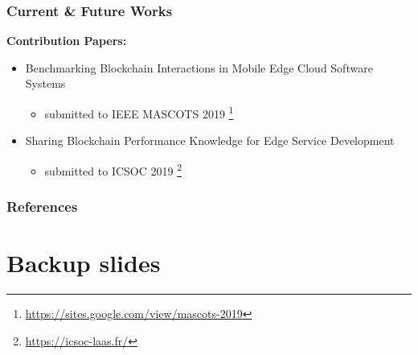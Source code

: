 \documentclass{beamer}
\begin{document}
	\begin{frame}
		\frametitle{Current \& Future Works}
		
		\textbf{Contribution Papers:}
		\begin{itemize}
			\item Benchmarking Blockchain Interactions in Mobile Edge Cloud Software Systems
			\begin{itemize}
				\item submitted to IEEE MASCOTS 2019 \footnote{\url{https://sites.google.com/view/mascots-2019}}
			\end{itemize}
			\item Sharing Blockchain Performance Knowledge for Edge Service Development
			\begin{itemize}
				\item submitted to ICSOC 2019 \footnote{\url{https://icsoc-laas.fr/}}
			\end{itemize}
		\end{itemize}
		
	\end{frame}

	\begin{frame}
		\frametitle{References}
		
		
	\end{frame}

	\appendix
	
	\section{Backup slides}
	
\end{document}
